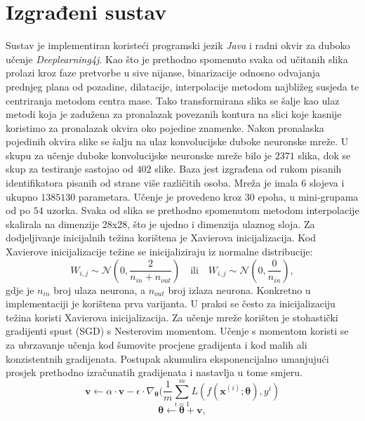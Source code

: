 \documentclass[times, utf8, diplomski]{fer}
\theoremstyle{definition}
\begin{document}
\chapter{Izgrađeni sustav}
Sustav je implementiran koristeći programski jezik \textit{Java} i radni okvir za duboko učenje \textit{Deeplearning4j}. Kao što je prethodno spomenuto svaka od učitanih slika prolazi kroz faze pretvorbe u sive nijanse, binarizacije odnosno odvajanja prednjeg plana od pozadine, dilatacije, interpolacije metodom najbližeg susjeda te centriranja metodom centra mase. Tako transformirana slika se šalje kao ulaz metodi koja je zadužena za pronalazak povezanih kontura na slici koje kasnije koristimo za pronalazak okvira oko pojedine znamenke. Nakon pronalaska pojedinih okvira slike se šalju na ulaz konvolucijske duboke neuronske mreže. U skupu za učenje duboke konvolucijske neuronske mreže bilo je $2371$ slika, dok se skup za testiranje sastojao od $402$ slike. Baza jest izgrađena od rukom pisanih identifikatora pisanih od strane više različitih osoba. Mreža je imala $6$ slojeva i ukupno $1385130$ parametara. Učenje je provedeno kroz $30$ epoha, u mini-grupama  od po $54$ uzorka. Svaka od slika se prethodno spomenutom metodom interpolacije skalirala na dimenzije 28x28, što je ujedno i dimenzija ulaznog sloja. Za dodjeljivanje inicijalnih težina korištena je Xavierova inicijalizacija. Kod Xavierove inicijalizacije težine se inicijaliziraju iz normalne distribucije:
\begin{equation}
W_{i, j} \sim \mathcal{N}(0, \frac{2}{n_{in} + n_{out}})\quad \textrm{ili} \quad W_{i, j} \sim \mathcal{N}(0, \frac{0}{n_{in}}),
\end{equation}
gdje je $n_{in}$ broj ulaza neurona, a $n_{out}$ broj izlaza neurona. Konkretno u implementaciji je korištena prva varijanta. U praksi se često za inicijalizaciju težina koristi Xavierova inicijalizacija.
Za učenje mreže korišten je stohastički gradijenti spust  (SGD) s Nesterovim momentom. Učenje s momentom koristi se za ubrzavanje učenja kod šumovite procjene gradijenta i kod malih ali konzistentnih gradijenata. Postupak akumulira eksponencijalno umanjujući prosjek prethodno izračunatih gradijenata i nastavlja u tome smjeru.
\begin{equation}
\bm{v} \leftarrow \alpha \cdot \bm{v} - \epsilon \cdot \nabla_{\bm{\theta}}(\frac{1}{m} \sum_{i=1}^{m}L(f(\bm{x}^{(i)}; \bm{\theta}), y^i )
\end{equation}
\begin{equation}
\bm{\theta} \leftarrow \bm{\theta} + \bm{v},
\end{equation}
\end{document}
